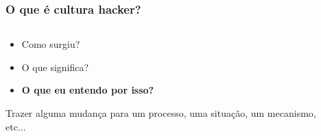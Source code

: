 \documentclass{beamer}
\begin{document}
\begin{frame}
  \frametitle{O que é cultura hacker?}
  \begin{columns}
    \begin{column}{0.5\textwidth}
      \begin{itemize}
        \item Como surgiu?
        \item O que significa?
        \item \textbf{O que eu entendo por isso?}
      \end{itemize}
      Trazer alguma mudança para um processo, uma situação, um mecanismo, etc...
    \end{column}
    \begin{column}{0.5\textwidth}
    \end{column}
  \end{columns}
\end{frame}
\end{document}
